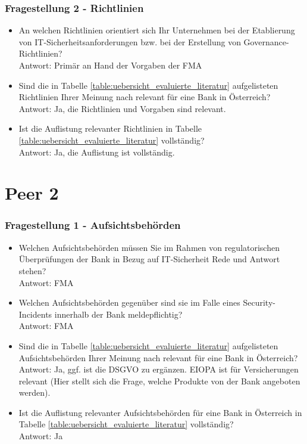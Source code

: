 \subsubsection{Fragestellung 2 - Richtlinien}
\begin{itemize}
    \item An welchen Richtlinien orientiert sich Ihr Unternehmen bei der Etablierung von IT-Sicherheitsanforderungen bzw. bei der Erstellung von Governance-Richtlinien?\\
    Antwort: Primär an Hand der Vorgaben der FMA\\
    \item Sind die in Tabelle \ref{table:uebersicht_evaluierte_literatur} aufgelisteten Richtlinien Ihrer Meinung nach relevant für eine Bank in Österreich?\\
    Antwort: Ja, die Richtlinien und Vorgaben sind relevant.\\
    \item Ist die Auflistung relevanter Richtlinien in Tabelle \ref{table:uebersicht_evaluierte_literatur} vollständig?\\
    Antwort: Ja, die Auflistung ist vollständig.\\
\end{itemize}
\bigbreak

\section{Peer 2}
\subsubsection{Fragestellung 1 - Aufsichtsbehörden}
\begin{itemize}
    \item Welchen Aufsichtsbehörden müssen Sie im Rahmen von regulatorischen Überprüfungen der Bank in Bezug auf IT-Sicherheit Rede und Antwort stehen?\\
    Antwort: FMA\\
    \item Welchen Aufsichtsbehörden gegenüber sind sie im Falle eines Security-Incidents innerhalb der Bank meldepflichtig?\\
    Antwort: FMA\\
    \item Sind die in Tabelle \ref{table:uebersicht_evaluierte_literatur} aufgelisteten Aufsichtsbehörden Ihrer Meinung nach relevant für eine Bank in Österreich?\\
    Antwort: Ja, ggf. ist die DSGVO zu ergänzen. EIOPA ist für Versicherungen relevant (Hier stellt sich die Frage, welche Produkte von der Bank angeboten werden).\\
    \item Ist die Auflistung relevanter Aufsichtsbehörden für eine Bank in Österreich in Tabelle \ref{table:uebersicht_evaluierte_literatur} vollständig?\\
    Antwort: Ja\\
\end{itemize}
